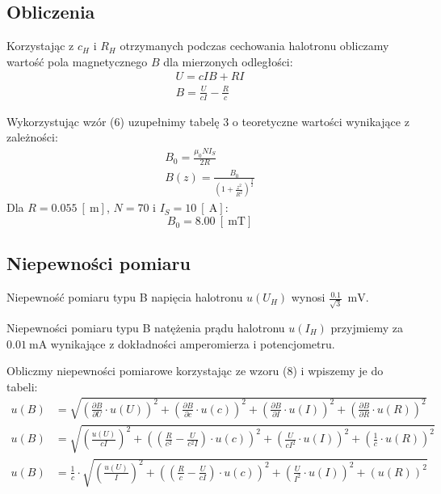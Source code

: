 \documentclass{fizykalab}
\begin{document}
{{{\subsection*{Obliczenia}
Korzystając z $c_H$ i $R_H$ otrzymanych podczas cechowania halotronu obliczamy wartość pola magnetycznego $B$ dla mierzonych odległości:
\begin{gather*}
	U = cIB + RI
	\\
	B = \frac{U}{cI} - \frac{R}{c}
	\tag{8}
\end{gather*}

\newpage

Wykorzystując wzór (6) uzupełnimy tabelę 3 o teoretyczne wartości wynikające z zależności:
\begin{gather*}
	B_0 = \frac{\mu_0 N I_S}{2R}
	\\
	B(z) = \frac{B_0}{\left( 1 + \frac{z^2}{R^2} \right)^\frac{3}{2}}
\end{gather*}
Dla $R = 0.055 \ [\SI{}{\meter}]$, $N = 70$ i $I_S = 10 \ [\SI{}{\ampere}]$:
\[ B_0 = 8.00 \ [\SI{}{\milli\tesla}] \]

\subsection*{Niepewności pomiaru}
\par
Niepewność pomiaru typu B napięcia halotronu $u(U_H)$ wynosi $\frac{0.1}{\sqrt{3}} \ \SI{}{\milli\volt}$.

Niepewności pomiaru typu B natężenia prądu halotronu $u(I_H)$ przyjmiemy za $\SI{0.01}{\milli\ampere}$ wynikające z dokładności amperomierza i potencjometru.

\mbox{}\newline
Obliczmy niepewności pomiarowe korzystając ze wzoru (8) i wpiszemy je do tabeli:
\begin{align*}
	u(B) & = \sqrt{\left( \frac{\partial B}{\partial U} \cdot u(U) \right)^2 + \left( \frac{\partial B}{\partial c} \cdot u(c) \right)^2 + \left( \frac{\partial B}{\partial I} \cdot u(I) \right)^2 + \left( \frac{\partial B}{\partial R} \cdot u(R) \right)^2}
	\\
	u(B) & = \sqrt{\left( \frac{u(U)}{cI} \right)^2 + \left( \left( \frac{R}{c^2} - \frac{U}{c^2I} \right) \cdot u(c) \right)^2 + \left( \frac{U}{cI^2} \cdot u(I) \right)^2 + \left( \frac{1}{c} \cdot u(R) \right)^2}
	\\
	u(B) & = \frac{1}{c} \cdot \sqrt{\left( \frac{u(U)}{I} \right)^2 + \left( \left( \frac{R}{c} - \frac{U}{cI} \right) \cdot u(c) \right)^2 + \left( \frac{U}{I^2} \cdot u(I) \right)^2 + \left( u(R) \right)^2}
	\tag{9}
\end{align*}

}}}
\end{document}

